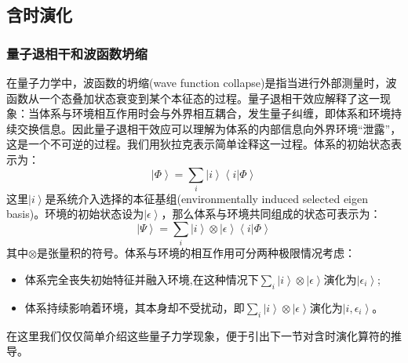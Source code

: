 \subsection{含时演化}
\subsubsection{量子退相干和波函数坍缩}
在量子力学中，波函数的坍缩(wave function collapse)\cite{wf_collapse}是指当进行外部测量时，波函数从一个态叠加状态衰变到某个本征态的过程。量子退相干效应解释了这一现象：当体系与环境相互作用时会与外界相互耦合，发生量子纠缠，即体系和环境持续交换信息\cite{decoherence}。因此量子退相干效应可以理解为体系的内部信息向外界环境“泄露”，这是一个不可逆的过程。我们用狄拉克表示简单诠释这一过程。体系的初始状态表示为：
\begin{equation}
  \left| \Phi \right> = \sum_i \left| i \right> \left< i | \Phi \right>
\end{equation}
这里$\left| i \right>$是系统介入选择的本征基组(environmentally induced selected eigen basis)。环境的初始状态设为$\left| \epsilon \right>$，那么体系与环境共同组成的状态可表示为：
\begin{equation}
  \left| \Psi \right> = \sum_i \left| i \right> \otimes \left| \epsilon \right> \left< i|\Phi \right>
\end{equation}
其中$\otimes$是张量积的符号。体系与环境的相互作用可分两种极限情况考虑：
\begin{itemize}
  \item 体系完全丧失初始特征并融入环境,在这种情况下$\sum_i \left| i \right> \otimes \left| \epsilon \right>$演化为$\left| \epsilon_i \right>$;
  \item 体系持续影响着环境，其本身却不受扰动，即$\sum_i \left| i \right> \otimes \left| \epsilon \right>$演化为$\left| i,\epsilon_i \right>$。
\end{itemize}\par 
在这里我们仅仅简单介绍这些量子力学现象，便于引出下一节对含时演化算符的推导。

